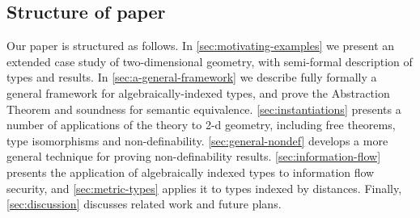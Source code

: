 \subsection{Structure of paper}
Our paper is structured as follows. In \autoref{sec:motivating-examples}
we present an extended case study of two-dimensional geometry, with semi-formal
description of types and results.
In \autoref{sec:a-general-framework} we describe fully formally a general framework
for algebraically-indexed types, and prove the Abstraction Theorem and
soundness for semantic equivalence. \autoref{sec:instantiations} presents a number
of applications of the theory to 2-d geometry, including free theorems, type isomorphisms
and non-definability. \autoref{sec:general-nondef} develops a more general technique 
for proving non-definability results. \autoref{sec:information-flow} presents
the application of algebraically indexed types to information flow security, and
\autoref{sec:metric-types} applies it to types indexed by distances.
Finally, \autoref{sec:discussion} discusses related work and future plans.


